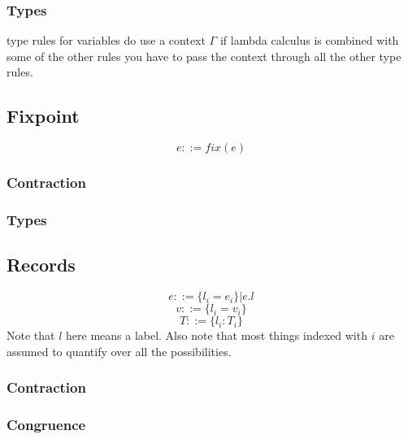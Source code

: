 \documentclass[10pt,a4paper]{article}
\begin{document}
\subsubsection{Types}
type rules for variables do use a context $Γ$ if lambda calculus is combined with
some of the other rules you have to pass the context through all the other type rules.

 \vspace{1em}
 \vspace{1em}
 \vspace{1em}



\subsection{Fixpoint}
\[e ::= fix(e)\]

\subsubsection{Contraction}
 \vspace{1em}

\subsubsection{Types}
 \vspace{1em}



\subsection{Records}
\[e ::= \{l_i = e_i\} | e.l \]
\[v ::= \{l_i = v_i\}\]
\[T ::= \{l_i : T_i\}\]
Note that $l$ here means a label.
Also note that most things indexed with $i$ are assumed to quantify over all the possibilities.

\subsubsection{Contraction}
 \vspace{1em}

\subsubsection{Congruence}
 \vspace{1em}
 \vspace{1em}
\end{document}
